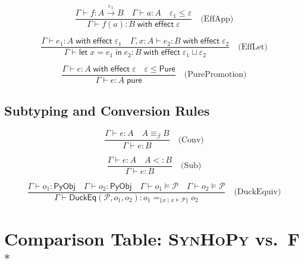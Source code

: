 \documentclass[11pt,a4paper]{report}
\theoremstyle{definition}
\theoremstyle{plain}
\newcommand{\PyObj}{\mathsf{PyObj}}
\newcommand{\Pure}{\mathsf{Pure}}
\newcommand{\DuckEq}{\mathsf{DuckEq}}
\newcommand{\fstar}{F$^{*}$}
\newcommand{\synhopy}{\textsc{SynHoPy}}
\begin{document}
\[
  \frac{
    \Gamma \vdash f : A \xrightarrow{\varepsilon_1} B \quad
    \Gamma \vdash a : A \quad
    \varepsilon_1 \leq \varepsilon
  }{
    \Gamma \vdash f(a) : B \;\mathsf{with\; effect}\; \varepsilon
  } \quad \text{(EffApp)}
\]

\[
  \frac{
    \Gamma \vdash e_1 : A \;\mathsf{with\; effect}\; \varepsilon_1 \quad
    \Gamma, x : A \vdash e_2 : B \;\mathsf{with\; effect}\; \varepsilon_2
  }{
    \Gamma \vdash \mathsf{let}\; x = e_1\; \mathsf{in}\; e_2 : B \;\mathsf{with\; effect}\; \varepsilon_1 \sqcup \varepsilon_2
  } \quad \text{(EffLet)}
\]

\[
  \frac{
    \Gamma \vdash e : A \;\mathsf{with\; effect}\; \varepsilon \quad
    \varepsilon \leq \Pure
  }{
    \Gamma \vdash e : A \;\mathsf{pure}
  } \quad \text{(PurePromotion)}
\]

\section{Subtyping and Conversion Rules}

\[
  \frac{
    \Gamma \vdash e : A \quad
    A \equiv_\beta B
  }{
    \Gamma \vdash e : B
  } \quad \text{(Conv)}
\]

\[
  \frac{
    \Gamma \vdash e : A \quad
    A <: B
  }{
    \Gamma \vdash e : B
  } \quad \text{(Sub)}
\]

\[
  \frac{
    \Gamma \vdash o_1 : \PyObj \quad
    \Gamma \vdash o_2 : \PyObj \quad
    \Gamma \vdash o_1 \models \mathcal{P} \quad
    \Gamma \vdash o_2 \models \mathcal{P}
  }{
    \Gamma \vdash \DuckEq(\mathcal{P}, o_1, o_2) : o_1 =_{\{x \mid x \models \mathcal{P}\}} o_2
  } \quad \text{(DuckEquiv)}
\]


\chapter{Comparison Table: \synhopy{} vs.\ \fstar{}}
\label{app:comparison}
\end{document}
